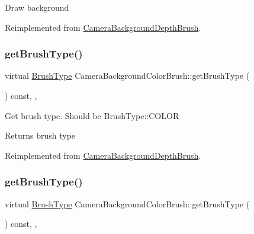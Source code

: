 Draw background 

Reimplemented from \hyperlink{classCameraBackgroundDepthBrush_afe438cdd7dbcf77d6421ec50224579d1}{Camera\+Background\+Depth\+Brush}.

\mbox{\label{classCameraBackgroundColorBrush_a96ecf77baa742b668db0d22c350b8f1b}} 
\subsubsection{\texorpdfstring{get\+Brush\+Type()}{getBrushType()}\hspace{0.1cm}{\footnotesize\ttfamily [1/2]}}
{\footnotesize\ttfamily virtual \hyperlink{classCameraBackgroundBrush_acb83e8d05e7ab9386c041d22c444760f}{Brush\+Type} Camera\+Background\+Color\+Brush\+::get\+Brush\+Type (\begin{DoxyParamCaption}{ }\end{DoxyParamCaption}) const\hspace{0.3cm}{\ttfamily [inline]}, {\ttfamily [override]}, {\ttfamily [virtual]}}

Get brush type. Should be Brush\+Type\+::\+C\+O\+L\+OR \begin{DoxyReturn}{Returns}
brush type 
\end{DoxyReturn}


Reimplemented from \hyperlink{classCameraBackgroundDepthBrush_ad4cc258ce1a1cd3ac43ea0d2580409d5}{Camera\+Background\+Depth\+Brush}.

\mbox{\label{classCameraBackgroundColorBrush_a96ecf77baa742b668db0d22c350b8f1b}} 
\subsubsection{\texorpdfstring{get\+Brush\+Type()}{getBrushType()}\hspace{0.1cm}{\footnotesize\ttfamily [2/2]}}
{\footnotesize\ttfamily virtual \hyperlink{classCameraBackgroundBrush_acb83e8d05e7ab9386c041d22c444760f}{Brush\+Type} Camera\+Background\+Color\+Brush\+::get\+Brush\+Type (\begin{DoxyParamCaption}{ }\end{DoxyParamCaption}) const\hspace{0.3cm}{\ttfamily [inline]}, {\ttfamily [override]}, {\ttfamily [virtual]}}

